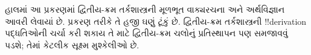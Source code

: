 \documentclass[../../../include/open-logic-chapter]{subfiles}
\begin{document}

\begin{editorial}
હાલમાં આ પ્રકરણમાં દ્વિતીય-ક્રમ તર્કશાસ્ત્રની મૂળભૂત વાક્યરચના અને
અર્થવિજ્ઞાન આવરી લેવાયાં છે. પ્રકરણ તરીકે તે હજી ઘણું ટૂંકું છે.
દ્વિતીય-ક્રમ તર્કશાસ્ત્રની !!{derivation} પદ્ધતિઓની ચર્ચા કરી શકાય તે
માટે દ્વિતીય-ક્રમ ચલોનું પ્રતિસ્થાપન પણ સમજાવવું પડશે; તેમાં કેટલીક
સૂક્ષ્મ મુશ્કેલીઓ છે.
\end{editorial}







\OLEndChapterHook
\end{document}
